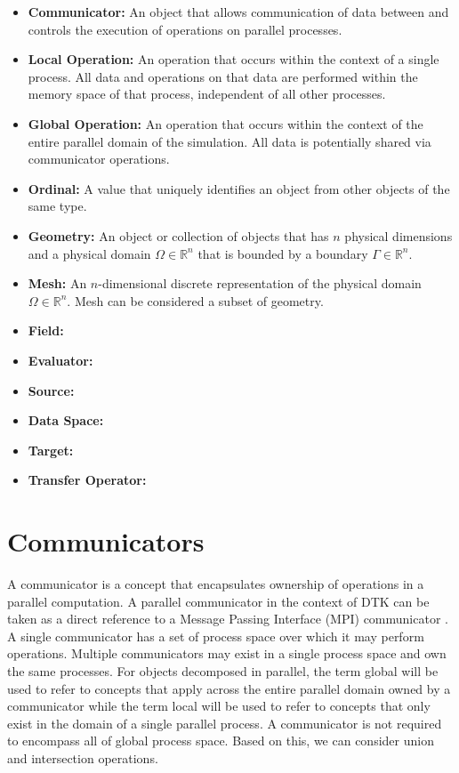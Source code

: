 \documentclass[letterpaper,12pt]{article}
\begin{document}
\begin{itemize}
\item {\bf Communicator:} An object that allows communication of data
  between and controls the execution of operations on parallel
  processes.
\item {\bf Local Operation:} An operation that occurs within the
  context of a single process. All data and operations on that data
  are performed within the memory space of that process, independent
  of all other processes.
\item {\bf Global Operation:} An operation that occurs within the
  context of the entire parallel domain of the simulation. All data is
  potentially shared via communicator operations.
\item {\bf Ordinal:} A value that uniquely identifies an object from
  other objects of the same type.
\item {\bf Geometry:} An object or collection of objects that has $n$
  physical dimensions and a physical domain $\Omega \in \mathbb{R}^n$
  that is bounded by a boundary $\Gamma \in \mathbb{R}^n$.
\item {\bf Mesh:} An $n$-dimensional discrete representation of the
  physical domain $\Omega \in \mathbb{R}^n$. Mesh can be considered a
  subset of geometry.
\item {\bf Field:}
\item {\bf Evaluator:}
\item {\bf Source:}
\item {\bf Data Space:}
\item {\bf Target:}
\item {\bf Transfer Operator:}
\end{itemize}

\clearpage

\section{Communicators}\label{sec:communicators}
A communicator is a concept that encapsulates ownership of operations
in a parallel computation. A parallel communicator in the context of
DTK can be taken as a direct reference to a Message Passing Interface
(MPI) communicator \cite{MPI_1994}. A single communicator has a set of
process space over which it may perform operations. Multiple
communicators may exist in a single process space and own the same
processes. For objects decomposed in parallel, the term global will be
used to refer to concepts that apply across the entire parallel domain
owned by a communicator while the term local will be used to refer to
concepts that only exist in the domain of a single parallel process. A
communicator is not required to encompass all of global process
space. Based on this, we can consider union and intersection
operations.
\end{document}
